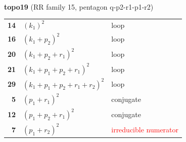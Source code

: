 \documentclass[10pt]{article}
\begin{document}
\begin{minipage}[t]{0.48\textwidth}
{}\\[2mm]\textbf{topo19} (RR family 15, pentagon q-p2-r1-p1-r2)\\[2pt]{\footnotesize\begin{tabular}{@{}r@{\ \ }l@{\ \ }l@{}}\textbf{14} & $(k_1)^2$ & loop\\
\textbf{16} & $(k_1+p_2)^2$ & loop\\
\textbf{20} & $(k_1+p_2+r_1)^2$ & loop\\
\textbf{21} & $(k_1+p_1+p_2+r_1)^2$ & loop\\
\textbf{29} & $(k_1+p_1+p_2+r_1+r_2)^2$ & loop\\
\textbf{5} & $(p_1+r_1)^2$ & conjugate\\
\textbf{12} & $(p_1+p_2+r_1)^2$ & conjugate\\
\textbf{7} & $(p_1+r_2)^2$ & \textcolor{red}{irreducible numerator}\\\end{tabular}}\end{minipage}\hfill%
\end{document}
